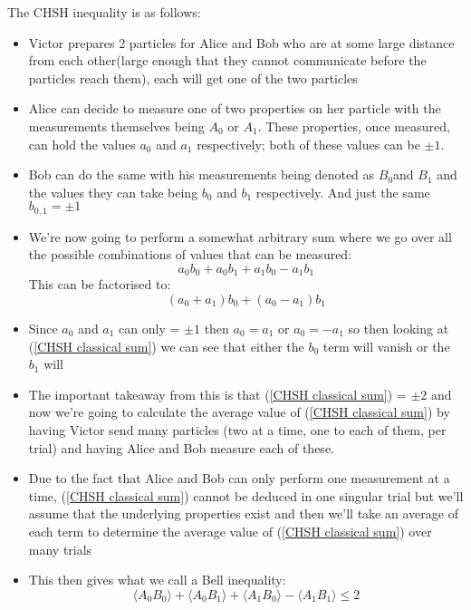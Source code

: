 The CHSH inequality is as follows:
\begin{itemize}
    \item Victor prepares 2 particles for Alice and Bob who are at some large distance from each other(large enough that they cannot communicate before the particles reach them), each will get one of the two particles
    \item Alice can decide to measure one of two properties on her particle with the measurements themselves being $A_{0}$ or $A_{1}$. These properties, once measured, can hold the values $a_{0}$ and $a_{1}$ respectively; both of these values can be $\pm 1$.  
    \item Bob can do the same with his measurements being denoted as $B_{0}$and $B_{1}$ and the values they can take being $b_{0}$ and $b_{1}$ respectively. And just the same $b_{0,1} = \pm 1$
    \item We're now going to perform a somewhat arbitrary sum where we go over all the possible combinations of values that can be measured: 
    \begin{equation}
    a_{0}b_{0} + a_{0}b_{1} + a_{1}b_{0} - a_{1}b_{1}
    \end{equation}
    This can be factorised to: 
    \begin{equation} \label{CHSH classical sum}
        (a_{0} + a_{1})b_{0} + (a_{0} - a_{1})b_{1}
    \end{equation}
    \item Since $a_{0}$ and $a_{1}$ can only = $\pm 1$ then $a_{0} = a_{1}$ or $a_{0} = -a_{1}$ so then looking at (\ref{CHSH classical sum}) we can see that either the $b_{0}$ term will vanish or the $b_{1}$ will
    \item The important takeaway from this is that (\ref{CHSH classical sum}) = $\pm 2$ and now we're going to calculate the average value of (\ref{CHSH classical sum}) by having Victor send many particles (two at a time, one to each of them, per trial) and having Alice and Bob measure each of these.
    \item Due to the fact that Alice and Bob can only perform one measurement at a time, (\ref{CHSH classical sum}) cannot be deduced in one singular trial but we'll assume that the underlying properties exist and then we'll take an average of each term to determine the average value of (\ref{CHSH classical sum}) over many trials
    \item This then gives what we call a Bell inequality:
    \begin{equation} \label{CHSH inequality}
        \langle A_{0}B_{0} \rangle + \langle A_{0}B_{1} \rangle + \langle A_{1}B_{0} \rangle- \langle A_{1}B_{1}\rangle \leq 2
    \end{equation}
\end{itemize}

